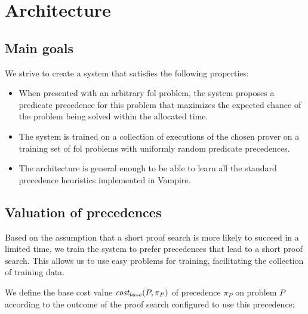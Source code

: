 \section{Architecture}
\label{sec:architecture}

\subsection{Main goals}

We strive to create a system that satisfies the following properties:

\begin{itemize}
	\item When presented with an arbitrary \gls{fol} problem,
	the system proposes a predicate precedence for this problem
	that maximizes the expected chance of the problem being solved
	within the allocated time.
	
	
	\item The system is trained on a collection of executions of the chosen prover
	on a training set of \gls{fol} problems
	with uniformly random predicate precedences.
	
	\item The architecture is general enough to be able to learn
	all the standard precedence heuristics implemented in Vampire.\cite{?}
\end{itemize}


\subsection{Valuation of precedences}
\label{sec:precedence-valuation}

Based on the assumption that a short proof search is more likely to succeed in a limited time\cite{?},
we train the system to prefer precedences that lead to a short proof search.
This allows us to use easy problems for training, facilitating the collection of training data.

We define the base cost
value \(\operatorname{\mathit{cost_{base}}}(P, \pi_P)\) of precedence \(\pi_P\) on problem \(P\)
according to the outcome of the proof search configured to use this precedence:

